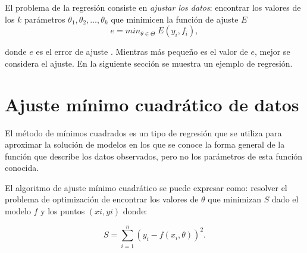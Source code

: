 El problema de la regresión consiste en \textit{ajustar los datos}: encontrar los valores de los $k$ parámetros $\theta_1, \theta_2, \dots, \theta_k$ que minimicen la función de ajuste $E$
\begin{equation*}
    e = min_{\theta \in \Theta} \; E(y_i, f_i),
\end{equation*}

donde $e$ es el error de ajuste \cite{statisticintroductions}. Mientras más pequeño es el valor de $e$, mejor se considera el ajuste. En la siguiente sección se muestra un ejemplo de regresión.





\section{Ajuste mínimo cuadrático de datos}\label{section:min_square}

El método de mínimos cuadrados es un tipo de regresión que se utiliza para aproximar la solución de modelos en los que se conoce la forma general de la función que describe los datos observados, pero no los parámetros de esta función conocida.

El algoritmo de ajuste mínimo cuadrático se puede expresar como: resolver el problema de optimización de encontrar los valores de $\theta$ que minimizan $S$ dado el modelo $f$ y los puntos $(xi, yi)$ donde:

$$S = \sum_{i=1}^{n}(y_i - f(x_i, \theta))^2.$$

